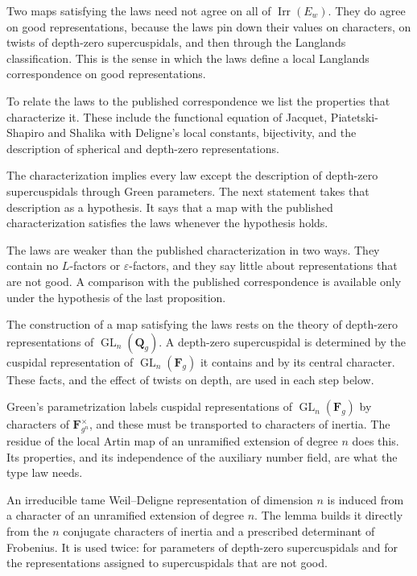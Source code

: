 Two maps satisfying the laws need not agree on all of $\operatorname{Irr}(E_w)$. They do agree on
good representations, because the laws pin down their values on characters, on twists of depth-zero
supercuspidals, and then through the Langlands classification. This is the sense in which the laws
define a local Langlands correspondence on good representations.

To relate the laws to the published correspondence we list the properties that characterize it.
These include the functional equation of Jacquet, Piatetski-Shapiro and Shalika with Deligne's local
constants, bijectivity, and the description of spherical and depth-zero representations.

The characterization implies every law except the description of depth-zero supercuspidals through
Green parameters. The next statement takes that description as a hypothesis. It says that a map with
the published characterization satisfies the laws whenever the hypothesis holds.

The laws are weaker than the published characterization in two ways. They contain no $L$-factors or
$\varepsilon$-factors, and they say little about representations that are not good. A comparison with
the published correspondence is available only under the hypothesis of the last proposition.

The construction of a map satisfying the laws rests on the theory of depth-zero representations of
$\operatorname{GL}_n(\mathbf Q_g)$. A depth-zero supercuspidal is determined by the cuspidal
representation of $\operatorname{GL}_n(\mathbf F_g)$ it contains and by its central character. These
facts, and the effect of twists on depth, are used in each step below.

Green's parametrization labels cuspidal representations of $\operatorname{GL}_n(\mathbf F_g)$ by
characters of $\mathbf F_{g^n}^\times$, and these must be transported to characters of inertia. The
residue of the local Artin map of an unramified extension of degree $n$ does this. Its properties,
and its independence of the auxiliary number field, are what the type law needs.

An irreducible tame Weil--Deligne representation of dimension $n$ is induced from a character of an
unramified extension of degree $n$. The lemma builds it directly from the $n$ conjugate characters of
inertia and a prescribed determinant of Frobenius. It is used twice: for parameters of depth-zero
supercuspidals and for the representations assigned to supercuspidals that are not good.

